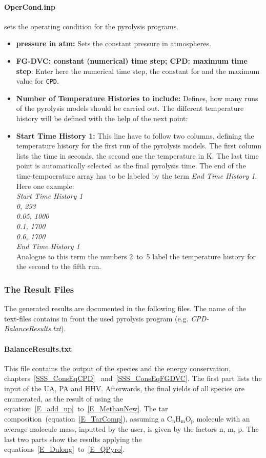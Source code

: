 \paragraph{OperCond.inp} sets the operating condition for the pyrolysis programs.
\begin{itemize}
  \item \textbf{pressure in atm:} Sets the constant pressure in atmospheres.
 \item \textbf{FG-DVC: constant (numerical) time step; CPD: maximum time step}: Enter here the numerical time step, the constant for \FGDVC and the maximum value for \texttt{CPD}.
 \item \textbf{Number of Temperature Histories to include:} Defines, how many runs of the pyrolysis  models should be carried out. The different temperature history will be defined with the help of the next point:
 \item \textbf{Start Time History 1:} This line have to follow two columns, defining the temperature history for the first run of the pyrolysis models. The first column lists the time in seconds, the second one the temperature in K. The last time point is automatically selected as the final pyrolysis time. The end of the time-tempoerature array has to be labeled by the term \emph{End Time History 1}. Here one example:\\
\emph{Start Time History 1\\
0, 293\\
0.05, 1000\\
0.1, 1700\\
0.6, 1700\\
End Time History 1\\}
Analogue to this term the numbers 2~to~5 label the temperature history for the second to the fifth run.
\end{itemize}


\subsubsection{The Result Files}\label{SSS_ResultsFiles}
The generated results are documented in the following files. The name of the text-files contains in front the used pyrolysis program (e.g. \emph{CPD-BalanceResults.txt}).

\paragraph{BalanceResults.txt}
This file contains the output of the species and the energy conservation, chapters~\ref{SSS_ConsEqCPD}
~and~\ref{SSS_ConsEqFGDVC}. The first part lists the input of the UA, PA and HHV. Afterwards, the final yields of all species are enumerated, as the result of using the equation~\ref{E_add_up}~to~\ref{E_MethanNew}. The tar composition~(equation~\ref{E_TarComp}), assuming a $\mathrm{C_nH_mO_p}$ molecule with an average molecule mass, inputted by the user, is given by the factors n, m, p. The last two parts show the results applying the equations~\ref{E_Dulong}~to~\ref{E_QPyro}.

